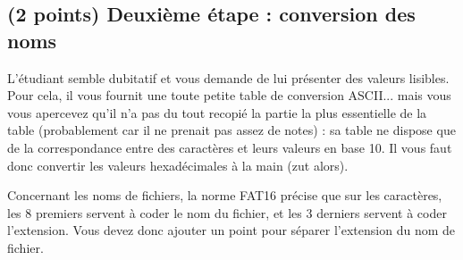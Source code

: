 \documentclass[11pt,a4paper]{article}
\begin{document}

\subsection{(2 points) Deuxième étape : conversion des noms }

L'étudiant semble dubitatif et vous demande de lui présenter des valeurs lisibles.
Pour cela, il vous fournit une toute petite table de conversion ASCII... mais vous vous apercevez qu'il n'a pas du tout recopié la partie la plus essentielle de la table (probablement car il ne prenait pas assez de notes) : sa table ne dispose que de la correspondance entre des caractères et leurs valeurs en base 10.
Il vous faut donc convertir les valeurs hexadécimales à la main (zut alors).

\medskip

Concernant les noms de fichiers, la norme FAT16 précise que sur les caractères, les 8 premiers servent à coder le nom du fichier, et les 3 derniers servent à coder l'extension.
Vous devez donc ajouter un point pour séparer l'extension du nom de fichier.

\medskip
\end{document}
